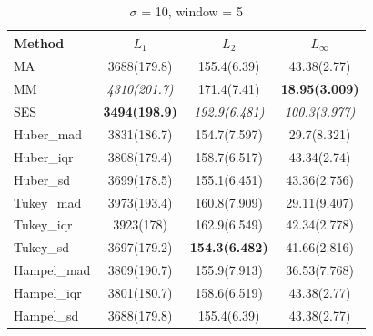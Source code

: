 \documentclass[letterpaper,12pt]{article}
\begin{document}
{%
\begin{table}[H]
\small
\centering
\caption{$\sigma$ = 10, window = 5}
\vspace{-2mm}
\label{tab:s10w5}
\begin{tabular}{lccc}
\toprule
Method      & $L_1$             & $L_2$             & $L_\infty$       \\
\midrule
MA           & 3688(179.8)       & 155.4(6.39)       & 43.38(2.77)      \\
MM           & \textit{4310(201.7)} & 171.4(7.41)       & \textbf{18.95(3.009)} \\
SES          & \textbf{3494(198.9)} & \textit{192.9(6.481)} & \textit{100.3(3.977)} \\
Huber\_mad   & 3831(186.7)       & 154.7(7.597)      & 29.7(8.321)      \\
Huber\_iqr   & 3808(179.4)       & 158.7(6.517)      & 43.34(2.74)      \\
Huber\_sd    & 3699(178.5)       & 155.1(6.451)      & 43.36(2.756)     \\
Tukey\_mad   & 3973(193.4)       & 160.8(7.909)      & 29.11(9.407)     \\
Tukey\_iqr   & 3923(178)         & 162.9(6.549)      & 42.34(2.778)     \\
Tukey\_sd    & 3697(179.2)       & \textbf{154.3(6.482)} & 41.66(2.816)     \\
Hampel\_mad  & 3809(190.7)       & 155.9(7.913)      & 36.53(7.768)     \\
Hampel\_iqr  & 3801(180.7)       & 158.6(6.519)      & 43.38(2.77)      \\
Hampel\_sd   & 3688(179.8)       & 155.4(6.39)       & 43.38(2.77)      \\
\bottomrule
\end{tabular}
\end{table}
\vspace{-6mm}

}
\end{document}
